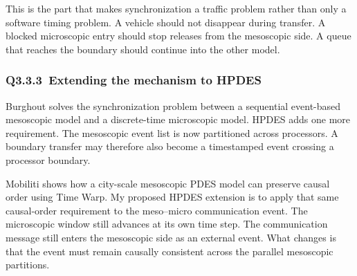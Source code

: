 \begin{bibunit}[plainnat]
This is the part that makes synchronization a traffic problem rather than only
a software timing problem. A vehicle should not disappear during transfer. A
blocked microscopic entry should stop releases from the mesoscopic side. A
queue that reaches the boundary should continue into the other model.

\subsubsection{Q3.3.3\ Extending the mechanism to HPDES}

Burghout solves the synchronization problem between a sequential event-based
mesoscopic model and a discrete-time microscopic model. HPDES adds one more
requirement. The mesoscopic event list is now partitioned across processors.
A boundary transfer may therefore also become a timestamped event crossing a
processor boundary.

Mobiliti shows how a city-scale mesoscopic PDES model can preserve causal order
using Time Warp. My proposed HPDES extension is to apply that same causal-order
requirement to the meso--micro communication event. The microscopic window
still advances at its own time step. The communication message still enters the
mesoscopic side as an external event. What changes is that the event must remain
causally consistent across the parallel mesoscopic partitions.

\bigskip
{}
{}
\putbib[refQ3]
\end{bibunit}
